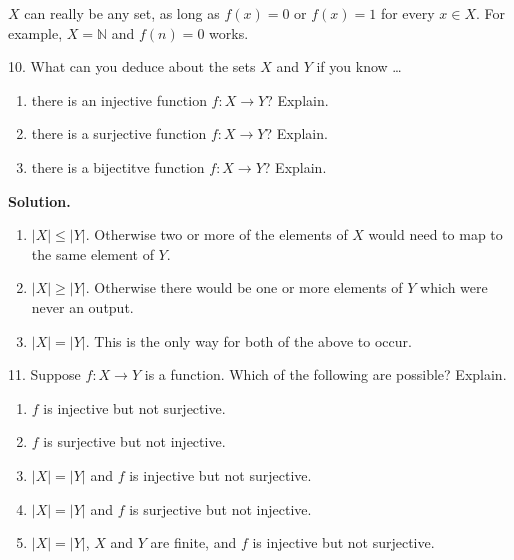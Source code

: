 \documentclass[10pt,]{book}
\theoremstyle{plain}
\theoremstyle{definition}
\theoremstyle{definition}
\theoremstyle{definition}
\numberwithin{equation}{section}
\def\N{\mathbb N}
\begin{document}
\begin{exerciselist}
            \(X\) can really be any set, as long as \(f(x) = 0\) or \(f(x) = 1\) for every \(x \in X\). For example, \(X = \N\) and \(f(n) = 0\) works.
\item[10.]\hypertarget{exercise-36}{}
            What can you deduce about the sets \(X\) and \(Y\) if you know
            \dots{}
\leavevmode%
\begin{enumerate}[label=(\alph*)]
\item\hypertarget{li-345}{}
                there is an injective function \(f:X \to Y\)? Explain.
\item\hypertarget{li-346}{}
                there is a surjective function \(f:X \to Y\)? Explain.
\item\hypertarget{li-347}{}
                there is a bijectitve function \(f:X \to Y\)? Explain.
\end{enumerate}
\par\smallskip
\par\smallskip
\noindent\textbf{Solution.}\hypertarget{solution-54}{}\quad
\leavevmode%
\begin{enumerate}[label=(\alph*)]
\item\hypertarget{li-348}{}\(|X| \le |Y|\). Otherwise two or more of the elements of \(X\) would need to map to the same element of \(Y\).%
\item\hypertarget{li-349}{}\(|X| \ge |Y|\). Otherwise there would be one or more elements of \(Y\) which were never an output.%
\item\hypertarget{li-350}{}\(|X| = |Y|\). This is the only way for both of the above to occur.%
\end{enumerate}
\item[11.]\hypertarget{exercise-37}{}
            Suppose \(f:X \to Y\) is a function. Which of the following are possible? Explain.
\leavevmode%
\begin{enumerate}[label=(\alph*)]
\item\hypertarget{li-351}{}\(f\) is injective but not surjective.%
\item\hypertarget{li-352}{}\(f\) is surjective but not injective.%
\item\hypertarget{li-353}{}\(|X| = |Y|\) and \(f\) is injective but not surjective.%
\item\hypertarget{li-354}{}\(|X| = |Y|\) and \(f\) is surjective but not injective.%
\item\hypertarget{li-355}{}\(|X| = |Y|\), \(X\) and \(Y\) are finite, and \(f\) is injective but not surjective.%

\end{enumerate}
\end{exerciselist}
\end{document}
